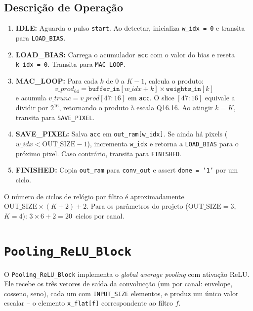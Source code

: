 \documentclass[a4paper,12pt]{article}
\begin{document}
\subsection{Descri\c{c}\~ao de Opera\c{c}\~ao}

\begin{enumerate}
    \item \textbf{IDLE:} Aguarda o pulso \texttt{start}. Ao detectar, inicializa \texttt{w\_idx = 0} e transita para \texttt{LOAD\_BIAS}.
    \item \textbf{LOAD\_BIAS:} Carrega o acumulador \texttt{acc} com o valor do bias e reseta \texttt{k\_idx = 0}. Transita para \texttt{MAC\_LOOP}.
    \item \textbf{MAC\_LOOP:} Para cada $k$ de 0 a $K-1$, calcula o produto:
    \[
        v\_prod_{64} = \texttt{buffer\_in}[w\_idx + k] \times \texttt{weights\_in}[k]
    \]
    e acumula $v\_trunc = v\_prod[47\!:\!16]$ em \texttt{acc}. O slice $[47\!:\!16]$ equivale a dividir por $2^{16}$, retornando o produto \`a escala Q16.16. Ao atingir $k = K$, transita para \texttt{SAVE\_PIXEL}.
    \item \textbf{SAVE\_PIXEL:} Salva \texttt{acc} em \texttt{out\_ram[w\_idx]}. Se ainda h\'a pixels ($w\_idx < \text{OUT\_SIZE}-1$), incrementa \texttt{w\_idx} e retorna a \texttt{LOAD\_BIAS} para o pr\'oximo pixel. Caso contr\'ario, transita para \texttt{FINISHED}.
    \item \textbf{FINISHED:} Copia \texttt{out\_ram} para \texttt{conv\_out} e assert \texttt{done = '1'} por um ciclo.
\end{enumerate}

O n\'umero de ciclos de rel\'ogio por filtro \'e aproximadamente $\text{OUT\_SIZE} \times (K + 2) + 2$. Para os par\^ametros do projeto ($\text{OUT\_SIZE}=3$, $K=4$): $3 \times 6 + 2 = 20$~ciclos por canal.


\section{\texttt{Pooling\_ReLU\_Block}}

O \texttt{Pooling\_ReLU\_Block} implementa o \textit{global average pooling} com ativa\c{c}\~ao ReLU. Ele recebe os tr\^es vetores de sa\'ida da convoluc\c{c}\~ao (um por canal: envelope, cosseno, seno), cada um com \texttt{INPUT\_SIZE} elementos, e produz um \'unico valor escalar -- o elemento \texttt{x\_flat[f]} correspondente ao filtro $f$.
\end{document}
